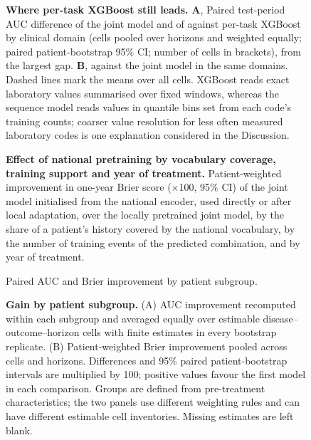 \begin{figure}[p]
  \caption{\textbf{Where per-task XGBoost still leads.} \textbf{A}, Paired
  test-period AUC difference of the joint model and of \opera{} against
  per-task XGBoost by clinical domain (cells pooled over horizons and weighted
  equally; paired patient-bootstrap 95\% CI; number of cells in brackets), from
  the largest gap. \textbf{B}, \opera{} against the joint model in the same
  domains. Dashed lines mark the means over all cells. XGBoost reads exact
  laboratory values summarised over fixed windows, whereas the sequence model
  reads values in quantile bins set from each code's training counts; coarser
  value resolution for less often measured laboratory codes is one explanation
  considered in the Discussion.}
  \label{fig:supp-xgboost-gap}
\end{figure}

\begin{figure}[p]
  \caption{\textbf{Effect of national pretraining by vocabulary coverage,
  training support and year of treatment.} Patient-weighted
  improvement in one-year Brier score ($\times$100, 95\% CI) of the joint model
  initialised from the national encoder, used directly or after local
  adaptation, over the locally pretrained joint model, by the share of a
  patient's history covered by the national vocabulary, by the number of
  training events of the predicted combination, and by year of treatment.}
  \label{fig:supp-national-where}
\end{figure}

\begin{figure}[p]
    {Paired AUC and Brier improvement by patient subgroup.}
  \caption{\textbf{Gain by patient subgroup.} (A) AUC improvement recomputed
  within each subgroup and averaged equally over estimable disease--outcome--horizon
  cells with finite estimates in every bootstrap replicate. (B) Patient-weighted
  Brier improvement pooled across cells and horizons. Differences and 95\%
  paired patient-bootstrap intervals are multiplied by 100; positive values
  favour the first model in each comparison. Groups are defined from
  pre-treatment characteristics; the two panels use different weighting rules
  and can have different estimable cell inventories. Missing estimates are
  left blank.}
  \label{fig:who-benefits}
\end{figure}

